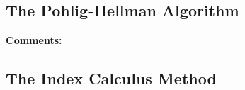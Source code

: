 \subsection{The Pohlig-Hellman Algorithm}

\noindent
\textbf{Comments:}

\subsection{The Index Calculus Method}



